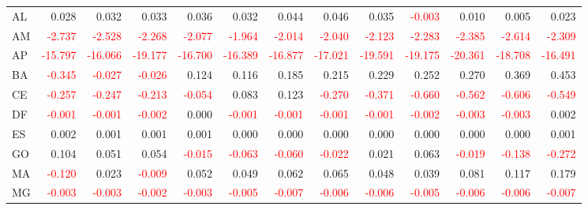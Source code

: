 \begin{table}[!htb]
{\begin{tabular}{lrrrrrrrrrrrr}
      AL & 0.028 & 0.032 & 0.033 & 0.036 & 0.032 & 0.044 & 0.046 & 0.035 & \textcolor{red}{-0.003} & 0.010 & 0.005 & 0.023 \\
      AM & \textcolor{red}{-2.737} & \textcolor{red}{-2.528} & \textcolor{red}{-2.268} & \textcolor{red}{-2.077} & \textcolor{red}{-1.964} & \textcolor{red}{-2.014} & \textcolor{red}{-2.040} & \textcolor{red}{-2.123} & \textcolor{red}{-2.283} & \textcolor{red}{-2.385} & \textcolor{red}{-2.614} & \textcolor{red}{-2.309} \\
      AP & \textcolor{red}{-15.797} & \textcolor{red}{-16.066} & \textcolor{red}{-19.177} & \textcolor{red}{-16.700} & \textcolor{red}{-16.389} & \textcolor{red}{-16.877} & \textcolor{red}{-17.021} & \textcolor{red}{-19.591} & \textcolor{red}{-19.175} & \textcolor{red}{-20.361} & \textcolor{red}{-18.708} & \textcolor{red}{-16.491} \\
      BA & \textcolor{red}{-0.345} & \textcolor{red}{-0.027} & \textcolor{red}{-0.026} & 0.124 & 0.116 & 0.185 & 0.215 & 0.229 & 0.252 & 0.270 & 0.369 & 0.453 \\
      CE & \textcolor{red}{-0.257} & \textcolor{red}{-0.247} & \textcolor{red}{-0.213} & \textcolor{red}{-0.054} & 0.083 & 0.123 & \textcolor{red}{-0.270} & \textcolor{red}{-0.371} & \textcolor{red}{-0.660} & \textcolor{red}{-0.562} & \textcolor{red}{-0.606} & \textcolor{red}{-0.549} \\
      DF & \textcolor{red}{-0.001} & \textcolor{red}{-0.001} & \textcolor{red}{-0.002} & 0.000 & \textcolor{red}{-0.001} & \textcolor{red}{-0.001} & \textcolor{red}{-0.001} & \textcolor{red}{-0.001} & \textcolor{red}{-0.002} & \textcolor{red}{-0.003} & \textcolor{red}{-0.003} & 0.002 \\
      ES & 0.002 & 0.001 & 0.001 & 0.001 & 0.000 & 0.000 & 0.000 & 0.000 & 0.000 & 0.000 & 0.000 & 0.001 \\
      GO & 0.104 & 0.051 & 0.054 & \textcolor{red}{-0.015} & \textcolor{red}{-0.063} & \textcolor{red}{-0.060} & \textcolor{red}{-0.022} & 0.021 & 0.063 & \textcolor{red}{-0.019} & \textcolor{red}{-0.138} & \textcolor{red}{-0.272} \\
      MA & \textcolor{red}{-0.120} & 0.023 & \textcolor{red}{-0.009} & 0.052 & 0.049 & 0.062 & 0.065 & 0.048 & 0.039 & 0.081 & 0.117 & 0.179 \\
      MG & \textcolor{red}{-0.003} & \textcolor{red}{-0.003} & \textcolor{red}{-0.002} & \textcolor{red}{-0.003} & \textcolor{red}{-0.005} & \textcolor{red}{-0.007} & \textcolor{red}{-0.006} & \textcolor{red}{-0.006} & \textcolor{red}{-0.005} & \textcolor{red}{-0.006} & \textcolor{red}{-0.006} & \textcolor{red}{-0.007} \\

\end{tabular}}
\end{table}
